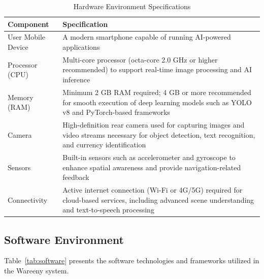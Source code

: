 \documentclass[a4paper]{report}
\begin{document}
\begin{table}[H]
\centering
\caption{Hardware Environment Specifications}
\label{tab:hardware}
\small
\begin{tabular}{@{}R{4cm}R{10cm}@{}}
\toprule
\textbf{Component} & \textbf{Specification} \\
\midrule
User Mobile Device & A modern smartphone capable of running AI-powered applications \\
\midrule
Processor (CPU) & Multi-core processor (octa-core 2.0 GHz or higher recommended) to support real-time image processing and AI inference \\
\midrule
Memory (RAM) & Minimum 2 GB RAM required; 4 GB or more recommended for smooth execution of deep learning models such as YOLO v8 and PyTorch-based frameworks \\
\midrule
Camera & High-definition rear camera used for capturing images and video streams necessary for object detection, text recognition, and currency identification \\
\midrule
Sensors & Built-in sensors such as accelerometer and gyroscope to enhance spatial awareness and provide navigation-related feedback \\
\midrule
Connectivity & Active internet connection (Wi-Fi or 4G/5G) required for cloud-based services, including advanced scene understanding and text-to-speech processing \\
\bottomrule
\end{tabular}
\end{table}
\newpage

\subsection{Software Environment}

Table~\ref{tab:software} presents the software technologies and frameworks utilized in the Wareeny system.
\end{document}
